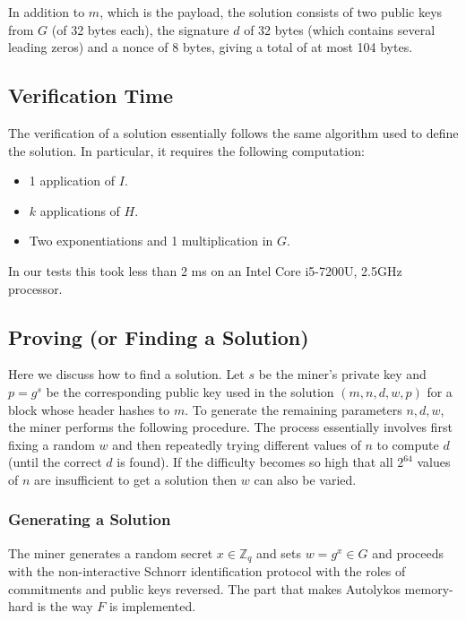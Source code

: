 \documentclass[runningheads]{llncs}
\newcommand{\powname}{Autolykos\xspace}
\begin{document}
In addition to $m$, which is the payload, the solution consists of two public keys from $G$ (of 32 bytes each), the signature $d$ of 32 bytes (which contains several leading zeros) and a nonce of 8 bytes, giving a total of at most 104 bytes. 

\subsection{Verification Time}
\label{verify}

The verification of a solution essentially follows the same algorithm used to define the solution. In particular, it requires the following computation:
\begin{itemize}
	\item 1 application of $I$.
	\item $k$ applications of $H$.
	\item Two exponentiations and 1 multiplication in $G$.
\end{itemize}
In our tests this took less than 2 ms on an Intel Core i5-7200U, 2.5GHz processor.

\subsection{Proving (or Finding a Solution)}
\label{generating}

Here we discuss how to find a solution.  
Let ${s}$ be the miner's private key and ${p} = g^{s}$ be the corresponding public key used in the solution $(m, n, d, w, p)$ for a block whose header hashes to $m$. To generate the remaining parameters $n, d, w$, the miner performs the following procedure. The process essentially involves first fixing a random $w$ and then repeatedly trying different values of $n$ to compute $d$ (until the correct $d$ is found). If the difficulty becomes so high that all $2^{64}$ values of $n$ are insufficient to get a solution then $w$ can also be varied.

\subsubsection{Generating a Solution}

The miner generates a random secret $x\in \mathbb{Z}_q$ and sets $w = g^x\in G$ and proceeds with the non-interactive Schnorr identification protocol with the roles of commitments and public keys reversed. 
The part that makes \powname memory-hard is the way $F$ is implemented. 
\end{document}
